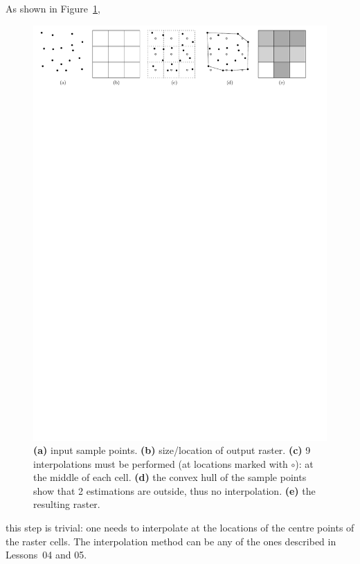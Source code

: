 As shown in Figure~\ref{fig:r-interpolation},
\begin{figure}[b]
  \centering
  \includegraphics[width=\linewidth]{figs/r-interpolation}
  \caption{\textbf{(a)} input sample points. \textbf{(b)} size/location of output raster. \textbf{(c)} 9 interpolations must be performed (at locations marked with $\circ$): at the middle of each cell. \textbf{(d)} the convex hull of the sample points show that 2 estimations are outside, thus no interpolation. \textbf{(e)} the resulting raster.}%
\label{fig:r-interpolation}
\end{figure}
this step is trivial: one needs to interpolate at the locations of the centre points of the raster cells.
The interpolation method can be any of the ones described in Lessons~04 and 05.






